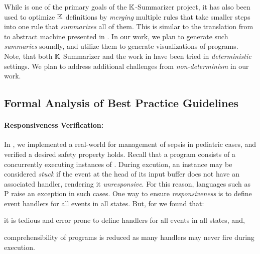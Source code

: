 While \SBC{} is one of the primary goals of the $\mathbb{K}{}$-Summarizer
project, it has also been used to optimize $\mathbb{K}$ definitions
by \emph{merging} multiple rules that take smaller steps into
one rule that \emph{summarizes} all of them. This is similar
to the translation from \SOS{} to abstract machine presented in
\cite{KoppelICFP22}. In our work, we plan to generate such
\emph{summaries} soundly, and utilize them to generate visualizations
of \MediK{} programs. Note, that both $\mathbb{K}$ Summarizer and the work
in \cite{KoppelICFP22} have been tried in \emph{deterministic} settings.
We plan to address additional challenges from \emph{non-determinism} in our
work.

\subsection{Formal Analysis of Best Practice Guidelines}

\paragraph{Responsiveness Verification:}

In \cite{SaxenaFMCAD23}, we implemented a real-world \CDSS{} for management of
sepsis in pediatric cases, and verified a desired safety property holds.
Recall that a \MediK{} program consists of a concurrently executing instances
of \FSMs{}. During excution, an instance may be considered \emph{stuck} if
the event at the head of its input buffer does not have an associated handler,
rendering it \emph{unresponsive}. For this reason, languages such as P
\cite{DesaiPLDI13} raise an exception in such cases. One way to ensure
\emph{responsiveness} is to define event handlers for all events
in all states. But, for \MediK{} we found that:
\begin{enumerate*}[label=(\alph*)]
  \item it is tedious and error prone to define handlers for all events in all
  states, and,
  \item comprehensibility of programs is reduced as many handlers may never fire
  during execution.
\end{enumerate*}

